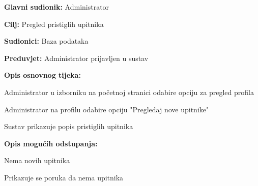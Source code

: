 					\noindent {}
					\begin{packed_item}
	
						\item \textbf{Glavni sudionik:} Administrator
						\item \textbf{Cilj:} Pregled pristiglih upitnika
						\item \textbf{Sudionici:} Baza podataka
						\item \textbf{Preduvjet:} Administrator prijavljen u sustav
						\item \textbf{Opis osnovnog tijeka:}
						
						\item[] \begin{packed_enum}
	
							\item Administrator u izborniku na početnoj stranici odabire opciju za pregled profila
							\item Administrator na profilu odabire opciju "Pregledaj nove upitnike"
							\item Sustav prikazuje popis pristiglih upitnika
							
						\end{packed_enum}
						
						\item  \textbf{Opis mogućih odstupanja:}
						
						\item[] \begin{packed_item}
	
							\item[2.a] Nema novih upitnika
							\item[] \begin{packed_enum}
								
								\item Prikazuje se poruka da nema upitnika
								
							\end{packed_enum}
							
						\end{packed_item}
					\end{packed_item}

